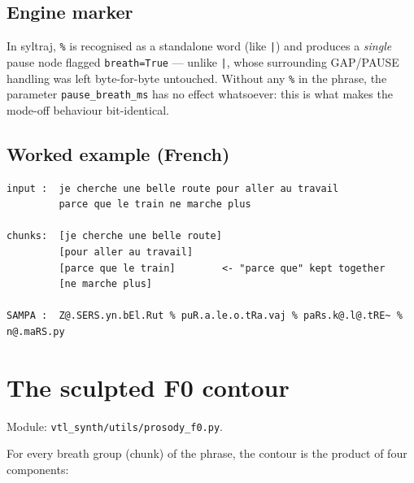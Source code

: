 \documentclass[11pt,a4paper]{article}
\newcommand{\ks}[1]{\texttt{#1}}
\begin{document}
\subsection{Engine marker}

In syltraj, \ks{\%} is recognised as a standalone word (like
\ks{|}) and produces a \emph{single} pause node flagged
\texttt{breath=True} --- unlike \ks{|}, whose surrounding GAP/PAUSE
handling was left byte-for-byte untouched. Without any \ks{\%} in
the phrase, the parameter \texttt{pause\_breath\_ms} has no effect
whatsoever: this is what makes the mode-off behaviour bit-identical.

\subsection{Worked example (French)}

\begin{lstlisting}[style=verbatim]
input :  je cherche une belle route pour aller au travail
         parce que le train ne marche plus

chunks:  [je cherche une belle route]
         [pour aller au travail]
         [parce que le train]        <- "parce que" kept together
         [ne marche plus]

SAMPA :  Z@.SERS.yn.bEl.Rut % puR.a.le.o.tRa.vaj % paRs.k@.l@.tRE~ % n@.maRS.py
\end{lstlisting}

\section{The sculpted F0 contour}\label{sec:f0}

Module: \texttt{vtl\_synth/utils/prosody\_f0.py}.

For every breath group (chunk) of the phrase, the contour is the
product of four components:
\end{document}
